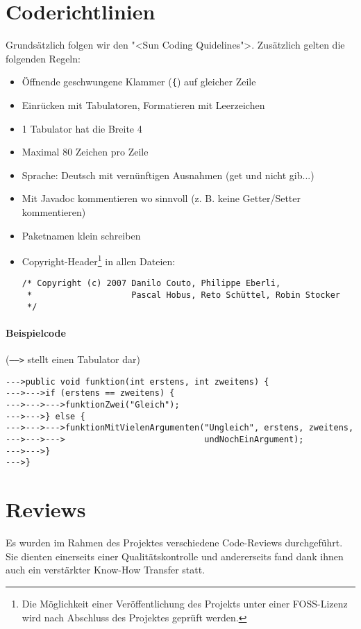 \documentclass[12pt,halfparskip]{scrartcl}
\begin{document}


\section{Coderichtlinien}\label{sub:coderichtlinien} %

Grundsätzlich folgen wir den "<Sun Coding Quidelines">. Zusätzlich gelten die folgenden Regeln:

\begin{itemize}
  \item Öffnende geschwungene Klammer (\texttt{\{}) auf gleicher Zeile
  \item Einrücken mit Tabulatoren, Formatieren mit Leerzeichen
  \item 1 Tabulator hat die Breite 4
  \item Maximal 80 Zeichen pro Zeile
  \item Sprache: Deutsch mit vernünftigen Ausnahmen (get und nicht gib...)
  \item Mit Javadoc kommentieren wo sinnvoll (z. B. keine Getter/Setter kommentieren)
  \item Paketnamen klein schreiben
  \item Copyright-Header\footnote{Die Möglichkeit einer Veröffentlichung des Projekts unter einer FOSS-Lizenz wird nach Abschluss des Projektes geprüft werden.} in allen Dateien:
    \begin{verbatim}
/* Copyright (c) 2007 Danilo Couto, Philippe Eberli,
 *                    Pascal Hobus, Reto Schüttel, Robin Stocker
 */
    \end{verbatim}
\end{itemize}


\paragraph{Beispielcode} (\texttt{----->} stellt einen Tabulator dar)

\begin{verbatim}
--->public void funktion(int erstens, int zweitens) {
--->--->if (erstens == zweitens) {
--->--->--->funktionZwei("Gleich");
--->--->} else {
--->--->--->funktionMitVielenArgumenten("Ungleich", erstens, zweitens,
--->--->--->                            undNochEinArgument);
--->--->}
--->}
\end{verbatim}

\section{Reviews} %
\label{sec:reviews}
Es wurden im Rahmen des Projektes verschiedene Code-Reviews durchgeführt. Sie dienten einerseits einer Qualitätskontrolle und andererseits fand dank ihnen auch ein verstärkter Know-How Transfer statt.
\end{document}
